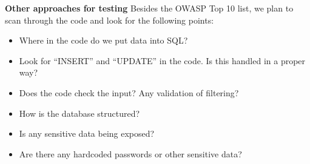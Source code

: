 {\bf Other approaches for testing}
Besides the OWASP Top 10 list, we plan to scan through the code and look for the following points:
\begin{itemize}
	\item Where in the code do we put data into SQL?
	\item Look for “INSERT” and “UPDATE” in the code. Is this handled in a proper way?
	\item Does the code check the input? Any validation of filtering?
	\item How is the database structured? 
	\item Is any sensitive data being exposed?
	\item Are there any hardcoded passwords or other sensitive data?
\end{itemize}

